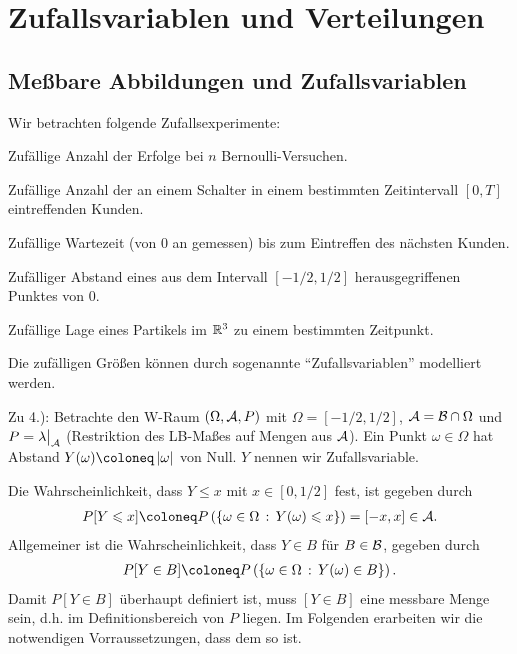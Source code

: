 \chapter{Zufallsvariablen und Verteilungen}

\section{Meßbare Abbildungen und Zufallsvariablen}

Wir betrachten folgende Zufallsexperimente:
\begin{defnenum}
  \item Zufällige Anzahl der Erfolge bei $n$ Bernoulli-Versuchen.
  \item Zufällige Anzahl der an einem Schalter in einem bestimmten
  Zeitintervall $[0,T]$ eintreffenden Kunden.
  \item  Zufällige Wartezeit (von $0$ an gemessen) bis zum Eintreffen des
  nächsten Kunden.
  \item Zufälliger Abstand eines aus dem Intervall $[-1/2,1/2]$
  herausgegriffenen Punktes von $0$.
  \item Zufällige Lage eines Partikels im $\R^3$ zu einem bestimmten Zeitpunkt.
\end{defnenum}

Die zufälligen Größen können durch sogenannte ``Zufallsvariablen''
modelliert werden.

\begin{bsp}
\label{bsp:3.1}
Zu 4.): Betrachte den W-Raum $(\Omega,\AA,P)$ mit $\Omega = [-1/2,1/2]$,
$\AA=\BB\cap\Omega$ und $P=\lambda\big|_{\AA}$ (Restriktion
des LB-Maßes auf Mengen aus $\AA$). Ein Punkt $\omega\in\Omega$ hat Abstand
$Y(\omega)\defl\abs{\omega}$ von Null. $Y$ nennen wir Zufallsvariable.

Die Wahrscheinlichkeit, dass $Y\le x$ mit $x\in[0,1/2]$ fest, ist gegeben durch
\begin{align*}
P[Y\le x] \defl P\left(\setdef{\omega\in \Omega}{Y(\omega)\le x} \right)
= [-x,x]\in \AA.
\end{align*}
Allgemeiner ist die Wahrscheinlichkeit, dass $Y\in B$ für $B\in\BB$, gegeben
durch
\begin{align*}
P[Y\in B] \defl P\left(\setdef{\omega\in\Omega}{Y(\omega)\in B}\right).
\end{align*}
Damit $P[Y\in B]$ überhaupt definiert ist, muss $[Y\in B]$ eine messbare Menge
sein, d.h. im Definitionsbereich von $P$ liegen. Im Folgenden
erarbeiten wir die notwendigen Vorraussetzungen, dass dem so ist.\bsphere
\end{bsp}

